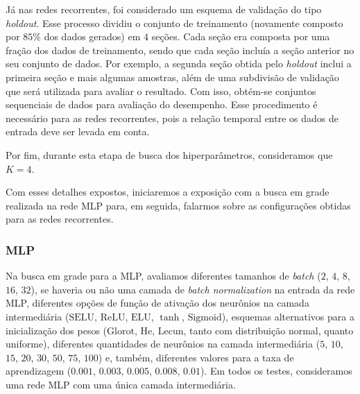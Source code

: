 \documentclass[a4paper, 12pt]{article}
\newcommand{\sigmoid}{\text{Sigmoid}}
\newcommand{\selu}{\text{SELU}}
\newcommand{\relu}{\text{ReLU}}
\newcommand{\elu}{\text{ELU}}
\newcommand{\lecun}{\text{Lecun}}
\newcommand{\he}{\text{He}}
\newcommand{\glorot}{\text{Glorot}}
\begin{document}
Já nas redes recorrentes, foi considerado um esquema de validação do tipo \textit{holdout}. Esse processo dividiu o conjunto de treinamento (novamente composto por $85\%$ dos dados gerados) em $4$ seções. Cada seção era composta por uma fração dos dados de treinamento, sendo que cada seção incluía a seção anterior no seu conjunto de dados. Por exemplo, a segunda seção obtida pelo \textit{holdout} inclui a primeira seção e mais algumas amostras, além de uma subdivisão de validação que será utilizada para avaliar o resultado. Com isso, obtém-se conjuntos sequenciais de dados para avaliação do desempenho. Esse procedimento é necessário para as redes recorrentes, pois a relação temporal entre os dados de entrada deve ser levada em conta.

Por fim, durante esta etapa de busca dos hiperparâmetros, consideramos que  $K = 4$. 

Com esses detalhes expostos, iniciaremos a exposição com a busca em grade realizada na rede MLP para, em seguida, falarmos sobre as configurações obtidas para as redes recorrentes.

\subsubsection{MLP}

Na busca em grade para a MLP, avaliamos diferentes tamanhos de \textit{batch} ($2$, $4$, $8$, $16$, $32$), se haveria ou não uma camada de \textit{batch normalization} na entrada da rede MLP, diferentes opções de função de ativação dos neurônios na camada intermediária ($\selu$, $\relu$, $\elu$, $\tanh$, $\sigmoid$), esquemas alternativos para a inicialização dos pesos ($\glorot$, $\he$, $\lecun$, tanto com distribuição normal, quanto uniforme), diferentes quantidades de neurônios na camada intermediária ($5$, $10$, $15$, $20$, $30$, $50$, $75$, $100$) e, também, diferentes valores para a taxa de aprendizagem ($0.001$, $0.003$, $0.005$, $0.008$, $0.01$). Em todos os testes, consideramos uma rede MLP com uma única camada intermediária. 
\end{document}

